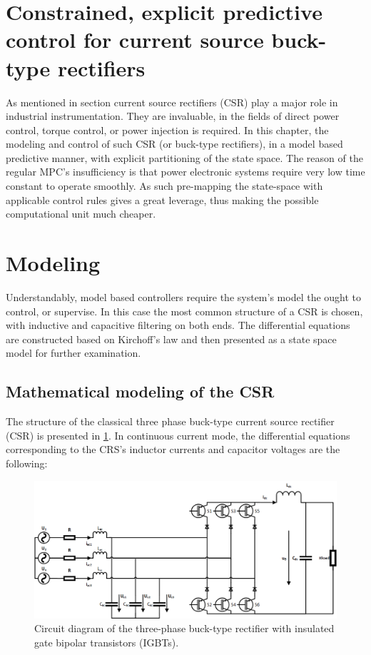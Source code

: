 \section[Predictive control of a CSR]{Constrained, explicit predictive control for current source buck-type rectifiers}\label{EMPC:sec:main}

As mentioned in section  current source rectifiers (CSR) play a major role in industrial instrumentation. They are invaluable, in the fields of direct power control, torque control, or power injection is required. In this chapter, the modeling and control of such CSR (or buck-type rectifiers), in a model based predictive manner, with explicit partitioning of the state space. The reason of the regular MPC's insufficiency is that power electronic systems require very low time constant to operate smoothly. As such pre-mapping the state-space with applicable control rules gives a great leverage, thus making the possible computational unit much cheaper.
		
\section{Modeling}\label{EMPC:sec:Modeling}

Understandably, model based controllers require the system's model the ought to control, or supervise. In this case the most common structure of a CSR is chosen, with inductive and capacitive filtering on both ends. The differential equations are constructed based on Kirchoff's law and then presented as a state space model for further examination.

\subsection{Mathematical modeling of the CSR}\label{EMPC:sec:ModelofCSR}

    The structure of the classical three phase buck-type current source rectifier (CSR) is presented in \ref{EMPC:fig:network}. In continuous current mode, the differential equations corresponding to the CRS’s inductor currents and capacitor voltages are the following:

    \begin{figure}[!ht]
        \centering
        \includegraphics[width=\textwidth]{EMPC_PNG_Pics/circuit.png}
        \caption{Circuit diagram of the three-phase buck-type rectifier with insulated gate bipolar transistors (IGBTs).}
        \label{EMPC:fig:network}
    \end{figure}
		
